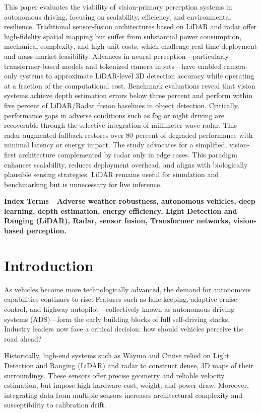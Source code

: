 \documentclass[12pt]{article}
\begin{document}
This paper evaluates the viability of vision-primary perception systems in
autonomous driving, focusing on scalability, efficiency, and environmental
resilience. Traditional sensor-fusion architectures based on LiDAR and radar
offer high-fidelity spatial mapping but suffer from substantial power
consumption, mechanical complexity, and high unit costs, which challenge
real-time deployment and mass-market feasibility. Advances in neural
perception—particularly transformer-based models and tokenized camera
inputs—have enabled camera-only systems to approximate LiDAR-level 3D detection
accuracy while operating at a fraction of the computational cost. Benchmark
evaluations reveal that vision systems achieve depth estimation errors below
three percent and perform within five percent of LiDAR/Radar fusion baselines in object detection.
Critically, performance gaps in adverse conditions such as fog or night driving are recoverable through the selective integration of millimeter-wave radar. This radar-augmented fallback restores over 80 percent of degraded performance with minimal latency or energy impact. The study advocates for a simplified, vision-first architecture complemented by radar only in edge cases. This paradigm enhances scalability, reduces deployment overhead, and aligns with biologically plausible sensing strategies. LiDAR remains useful for simulation and benchmarking but is unnecessary for live inference.

\textbf{Index Terms—Adverse weather robustness, autonomous vehicles, deep
	learning, depth estimation, energy efficiency, Light Detection and Ranging
(LiDAR), Radar, sensor fusion, Transformer networks, vision-based perception.}
\newpage

\section{Introduction}

As vehicles become more technologically advanced, the demand for autonomous
capabilities continues to rise. Features such as lane keeping, adaptive cruise
control, and highway autopilot—collectively known as autonomous driving systems (ADS)—form the early building blocks of full self-driving stacks. Industry leaders now face a critical decision: how should vehicles perceive the road ahead?

Historically, high-end systems such as Waymo and Cruise relied on Light Detection and Ranging (LiDAR) and radar to construct dense, 3D maps of their surroundings. These sensors offer precise geometry and reliable velocity estimation, but impose high hardware cost, weight, and power draw. Moreover, integrating data from multiple sensors increases architectural complexity and susceptibility to calibration drift.
\end{document}
